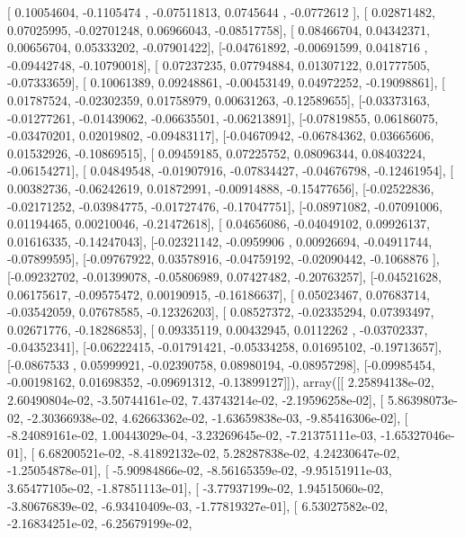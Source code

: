 \documentclass{article}
\begin{document}
       [ 0.10054604, -0.1105474 , -0.07511813,  0.0745644 , -0.0772612 ],
       [ 0.02871482,  0.07025995, -0.02701248,  0.06966043, -0.08517758],
       [ 0.08466704,  0.04342371,  0.00656704,  0.05333202, -0.07901422],
       [-0.04761892, -0.00691599,  0.0418716 , -0.09442748, -0.10790018],
       [ 0.07237235,  0.07794884,  0.01307122,  0.01777505, -0.07333659],
       [ 0.10061389,  0.09248861, -0.00453149,  0.04972252, -0.19098861],
       [ 0.01787524, -0.02302359,  0.01758979,  0.00631263, -0.12589655],
       [-0.03373163, -0.01277261, -0.01439062, -0.06635501, -0.06213891],
       [-0.07819855,  0.06186075, -0.03470201,  0.02019802, -0.09483117],
       [-0.04670942, -0.06784362,  0.03665606,  0.01532926, -0.10869515],
       [ 0.09459185,  0.07225752,  0.08096344,  0.08403224, -0.06154271],
       [ 0.04849548, -0.01907916, -0.07834427, -0.04676798, -0.12461954],
       [ 0.00382736, -0.06242619,  0.01872991, -0.00914888, -0.15477656],
       [-0.02522836, -0.02171252, -0.03984775, -0.01727476, -0.17047751],
       [-0.08971082, -0.07091006,  0.01194465,  0.00210046, -0.21472618],
       [ 0.04656086, -0.04049102,  0.09926137,  0.01616335, -0.14247043],
       [-0.02321142, -0.0959906 ,  0.00926694, -0.04911744, -0.07899595],
       [-0.09767922,  0.03578916, -0.04759192, -0.02090442, -0.1068876 ],
       [-0.09232702, -0.01399078, -0.05806989,  0.07427482, -0.20763257],
       [-0.04521628,  0.06175617, -0.09575472,  0.00190915, -0.16186637],
       [ 0.05023467,  0.07683714, -0.03542059,  0.07678585, -0.12326203],
       [ 0.08527372, -0.02335294,  0.07393497,  0.02671776, -0.18286853],
       [ 0.09335119,  0.00432945,  0.0112262 , -0.03702337, -0.04352341],
       [-0.06222415, -0.01791421, -0.05334258,  0.01695102, -0.19713657],
       [-0.0867533 ,  0.05999921, -0.02390758,  0.08980194, -0.08957298],
       [-0.09985454, -0.00198162,  0.01698352, -0.09691312, -0.13899127]]), array([[  2.25894138e-02,   2.60490804e-02,  -3.50744161e-02,
          7.43743214e-02,  -2.19596258e-02],
       [  5.86398073e-02,  -2.30366938e-02,   4.62663362e-02,
         -1.63659838e-03,  -9.85416306e-02],
       [ -8.24089161e-02,   1.00443029e-04,  -3.23269645e-02,
         -7.21375111e-03,  -1.65327046e-01],
       [  6.68200521e-02,  -8.41892132e-02,   5.28287838e-02,
          4.24230647e-02,  -1.25054878e-01],
       [ -5.90984866e-02,  -8.56165359e-02,  -9.95151911e-03,
          3.65477105e-02,  -1.87851113e-01],
       [ -3.77937199e-02,   1.94515060e-02,  -3.80676839e-02,
         -6.93410409e-03,  -1.77819327e-01],
       [  6.53027582e-02,  -2.16834251e-02,  -6.25679199e-02,
\end{document}
